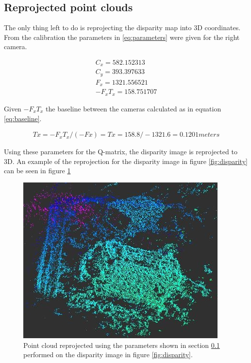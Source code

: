 \subsection{Reprojected point clouds} \label{sec:repro_point}

The only thing left to do is reprojecting the disparity map into 3D coordinates. From the calibration the parameters in \ref{eq:parameters} were given for the right camera.

\begin{equation}\label{eq:parameters}
\begin{split}
C_{x} = 582.152313 \\
C_{y} = 393.397633 \\
F_{x} = 1321.556521 \\
-F_{x}T_{x} = 158.751707 
\end{split}
\end{equation} 

Given $ -F_{x}T_{x} $ the baseline between the cameras calculated as in equation \ref{eq:baseline}.

\begin{equation}\label{eq:baseline}
\begin{split}
Tx = -F_{x}T_{x}/(-Fx) = Tx = 158.8/-1321.6 = 0.1201 meters
\end{split}
\end{equation} 

Using these parameters for the Q-matrix, the disparity image is reprojected to 3D. An example of the reprojection for the disparity image in figure \ref{fig:disparity} can be seen in figure \ref{fig:point_repro}


\begin{figure}[h!]
  \centering
    \includegraphics[scale=0.7]{graphics/06_vision/point_cloud_example2.jpg} %
  \caption{Point cloud reprojected using the parameters shown in section \ref{sec:repro_point} performed on the disparity image in figure \ref{fig:disparity}. }
    \label{fig:point_repro}
\end{figure}


